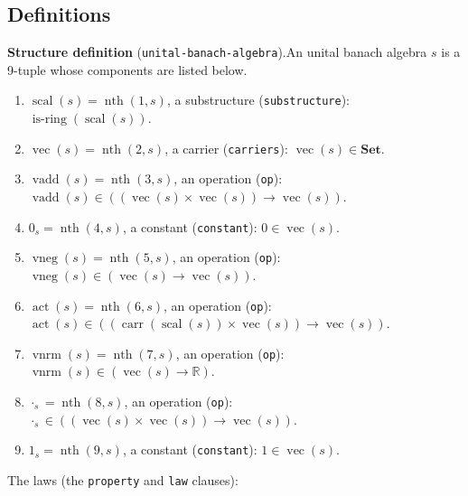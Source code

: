 \documentclass[11pt]{article}
\theoremstyle{plain}
\begin{document}
\subsection*{Definitions}
\par\medskip\noindent\textbf{Structure definition} (\texttt{unital-banach-algebra}).\;An unital banach algebra $s$ is a 9-tuple whose components are listed below.\par
\begin{enumerate}[nosep]
\item $\operatorname{scal}(s) = \operatorname{nth}(1, s)$, a substructure (\texttt{substructure}): $\operatorname{is\text{-}ring}(\operatorname{scal}(s))$.
\item $\operatorname{vec}(s) = \operatorname{nth}(2, s)$, a carrier (\texttt{carriers}): $\operatorname{vec}(s) \in \mathbf{Set}$.
\item $\operatorname{vadd}(s) = \operatorname{nth}(3, s)$, an operation (\texttt{op}): $\operatorname{vadd}(s) \in ((\operatorname{vec}(s) \times \operatorname{vec}(s)) \to \operatorname{vec}(s))$.
\item $0_{s} = \operatorname{nth}(4, s)$, a constant (\texttt{constant}): $0 \in \operatorname{vec}(s)$.
\item $\operatorname{vneg}(s) = \operatorname{nth}(5, s)$, an operation (\texttt{op}): $\operatorname{vneg}(s) \in (\operatorname{vec}(s) \to \operatorname{vec}(s))$.
\item $\operatorname{act}(s) = \operatorname{nth}(6, s)$, an operation (\texttt{op}): $\operatorname{act}(s) \in ((\operatorname{carr}(\operatorname{scal}(s)) \times \operatorname{vec}(s)) \to \operatorname{vec}(s))$.
\item $\operatorname{vnrm}(s) = \operatorname{nth}(7, s)$, an operation (\texttt{op}): $\operatorname{vnrm}(s) \in (\operatorname{vec}(s) \to \mathbb{R})$.
\item $\cdot_{s} = \operatorname{nth}(8, s)$, an operation (\texttt{op}): $\cdot_{s} \in ((\operatorname{vec}(s) \times \operatorname{vec}(s)) \to \operatorname{vec}(s))$.
\item $1_{s} = \operatorname{nth}(9, s)$, a constant (\texttt{constant}): $1 \in \operatorname{vec}(s)$.
\end{enumerate}
The laws (the \texttt{property} and \texttt{law} clauses):
\end{document}
